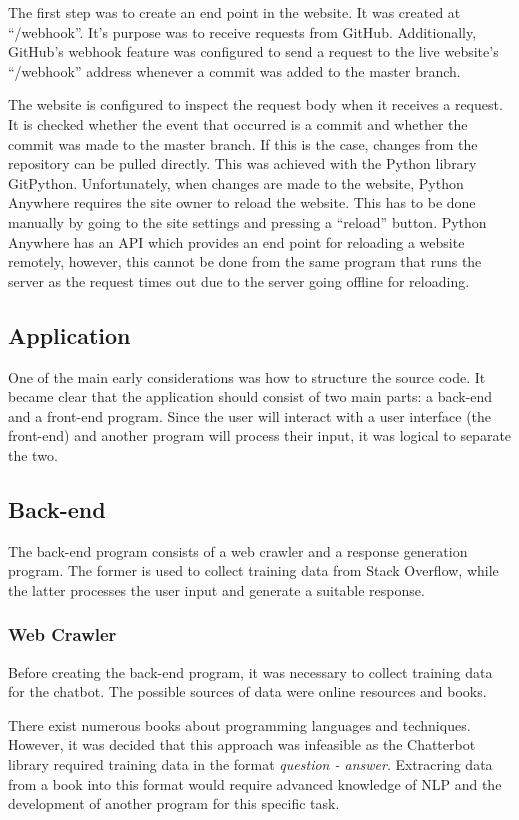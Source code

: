 \documentclass[12pt,a4paper]{article}
\begin{document}
The first step was to create an end point in the website. It was created at “/webhook”. It’s purpose was to receive requests from GitHub. Additionally, GitHub's webhook feature was configured to send a request to the live website’s “/webhook” address whenever a commit was added to the master branch. 

The website is configured to inspect the request body when it receives a request. It is checked whether the event that occurred is a commit and whether the commit was made to the master branch. If this is the case, changes from the repository can be pulled directly. This was achieved with the Python library GitPython. Unfortunately, when changes are made to the website, Python Anywhere requires the site owner to reload the website. This has to be done manually by going to the site settings and pressing a \enquote{reload} button. Python Anywhere has an API which provides an end point for reloading a website remotely, however, this cannot be done from the same program that runs the server as the request times out due to the server going offline for reloading. 


\subsection{Application}
One of the main early considerations was how to structure the source code. It became clear that the application should consist of two main parts: a back-end and a front-end program. Since the user will interact with a user interface (the front-end) and another program will process their input, it was logical to separate the two.

\subsection{Back-end}
The back-end program consists of a web crawler and a response generation program. The former is used to collect training data from Stack Overflow, while the latter processes the user input and generate a suitable response.

\subsubsection{Web Crawler}\label{subsub:crawler}
Before creating the back-end program, it was necessary to collect training data for the chatbot. The possible sources of data were online resources and books. 

There exist numerous books about programming languages and techniques. However, it was decided that this approach was infeasible as the Chatterbot library required training data in the format \textit{question - answer}. Extracring data from a book into this format would require advanced knowledge of NLP and the development of another program for this specific task.
\end{document}

